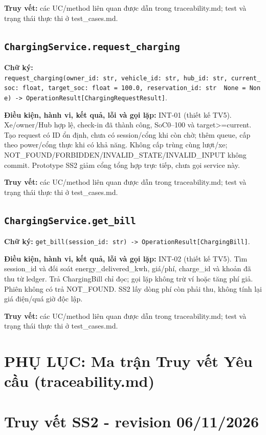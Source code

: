 \documentclass[11pt,a4paper]{article}
\begin{document}
\textbf{Truy vết:} các UC/method liên quan được dẫn trong
traceability.md; test và trạng thái thực thi ở test\_cases.md.

\hypertarget{chargingservice.request_charging}{%
\subsection{\texorpdfstring{\texttt{ChargingService.request\_charging}}{ChargingService.request\_charging}}\label{chargingservice.request_charging}}

\textbf{Chữ ký:}
\texttt{request\_charging(owner\_id:\ str,\ vehicle\_id:\ str,\ hub\_id:\ str,\ current\_soc:\ float,\ target\_soc:\ float\ =\ 100.0,\ reservation\_id:\ str\ \textbar{}\ None\ =\ None)\ -\textgreater{}\ OperationResult{[}ChargingRequestResult{]}}.

\textbf{Điều kiện, hành vi, kết quả, lỗi và gọi lặp:} INT-01 (thiết kế
TV5). Xe/owner/Hub hợp lệ, check-in đã thành công, SoC0--100 và
target\textgreater=current. Tạo request có ID ổn định, chưa có
session/cổng khi còn chờ; thêm queue, cấp theo power/cổng thực khi có
khả năng. Không cấp trùng cùng lượt/xe;
NOT\_FOUND/FORBIDDEN/INVALID\_STATE/INVALID\_INPUT không commit.
Prototype SS2 giảm cổng tổng hợp trực tiếp, chưa gọi service này.

\textbf{Truy vết:} các UC/method liên quan được dẫn trong
traceability.md; test và trạng thái thực thi ở test\_cases.md.

\hypertarget{chargingservice.get_bill}{%
\subsection{\texorpdfstring{\texttt{ChargingService.get\_bill}}{ChargingService.get\_bill}}\label{chargingservice.get_bill}}

\textbf{Chữ ký:}
\texttt{get\_bill(session\_id:\ str)\ -\textgreater{}\ OperationResult{[}ChargingBill{]}}.

\textbf{Điều kiện, hành vi, kết quả, lỗi và gọi lặp:} INT-02 (thiết kế
TV5). Tìm session\_id và đối soát energy\_delivered\_kwh, giá/phí,
charge\_id và khoản đã thu từ ledger. Trả ChargingBill chỉ đọc; gọi lặp
không trừ ví hoặc tăng phí giả. Phiên không có trả NOT\_FOUND. SS2 lấy
dòng phí còn phải thu, không tính lại giá điện/quá giờ độc lập.

\textbf{Truy vết:} các UC/method liên quan được dẫn trong
traceability.md; test và trạng thái thực thi ở test\_cases.md.

\newpage
\section*{PHỤ LỤC: Ma trận Truy vết Yêu cầu (traceability.md)}
\hypertarget{truy-vux1ebft-ss2---revision-06112026}{%
\section{Truy vết SS2 - revision
06/11/2026}\label{truy-vux1ebft-ss2---revision-06112026}}
\end{document}

